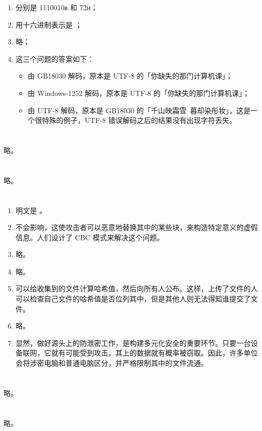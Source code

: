 \begin{enumerate}
  \item 分别是 1110010ʙ 和 72ʜ；
  \item 用十六进制表示是 ；
  \item 略；
  \item 这三个问题的答案如下：
    \begin{itemize}
      \item 由 GB18030 解码，原本是 UTF-8 的「你缺失的那门计算机课」；
      \item 由 Windows-1252 解码，原本是 UTF-8 的「你缺失的那门计算机课」；
      \item 由 UTF-8 解码，原本是 GB18030 的「千山映霜雪\ 暮却染彤妆」，这是一个很特殊的例子，UTF-8 错误解码之后的结果没有出现字符丢失。
    \end{itemize}
\end{enumerate}

\section{}

略。

\section{}

略。

\section{}

\begin{enumerate}
  \item 明文是 。
  \item 不会影响，这使攻击者可以恶意地替换其中的某些块，来构造特定意义的虚假信息。人们设计了 CBC 模式来解决这个问题。
  \item 略。
  \item 略。
  \item 可以给收集到的文件计算哈希值，然后向所有人公布。这样，上传了文件的人可以检查自己文件的哈希值是否位列其中，但是其他人则无法得知谁提交了文件。
  \item 略。
  \item 显然，做好源头上的防泄密工作，是构建多元化安全的重要环节。只要一台设备联网，它就有可能受到攻击，其上的数据就有概率被窃取。因此，许多单位会将涉密电脑和普通电脑区分，并严格限制其中的文件流通。
\end{enumerate}

\section{}

略。

\section{}

略。